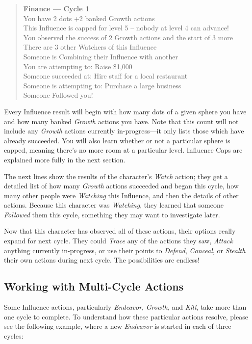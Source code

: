 \begin{quote}
	\textbf{Finance --- Cycle 1} \\
	You have 2 dots +2 banked Growth actions \\
	This Influence is capped for level 5 -- nobody at level 4 can advance!  \\
	
	You observed the success of 2 Growth actions and the start of 3 more \\
	There are 3 other Watchers of this Influence  \\
	Someone is Combining their Influence with another \\
	You are attempting to: Raise \$1,000 \\
	Someone succeeded at:  Hire staff for a local restaurant \\
	Someone is attempting to:  Purchase a large business \\
	Someone Followed you!
\end{quote}

\noindent Every Influence result will begin with how many dots of a given sphere you have and how many banked 
\emph{Growth} actions you have.  Note that this count will not include any \emph{Growth} actions currently 
in-progress---it only lists those which have already succeeded.  You will also learn whether or not a 
particular sphere is capped, meaning there's no more room at a particular level.  Influence Caps are explained 
more fully in the next section.

The next lines show the results of the character's \emph{Watch} action; they get a detailed list of how many 
\emph{Growth} actions succeeded and began this cycle, how many other people were \emph{Watching} this Influence, 
and then the details of other actions.  Because this character was \emph{Watching}, they learned that someone 
\emph{Followed} them this cycle, something they may want to investigate later.

Now that this character has observed all of these actions, their options really expand for next cycle.  They could 
\emph{Trace} any of the actions they saw, \emph{Attack} anything currently in-progress, or use their points to 
\emph{Defend}, \emph{Conceal}, or \emph{Stealth} their own actions during next cycle.  The possibilities are 
endless!

\subsection{Working with Multi-Cycle Actions}
Some Influence actions, particularly \emph{Endeavor}, \emph{Growth}, and \emph{Kill}, take more than one cycle to 
complete.  To understand how these particular actions resolve, please see the following example, where a new 
\emph{Endeavor} is started in each of three cycles: \\

